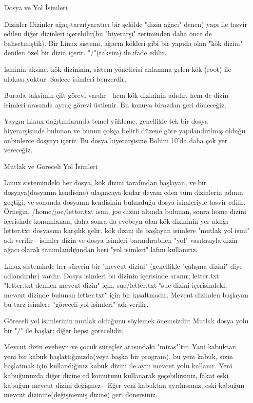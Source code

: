 \begin{section}{Dosya ve Yol İsimleri}
\begin{subsection}{Dizinler}
	Dizinler ağaç-tarzı(yaratıcı bir şekilde "dizin ağacı"  denen) yapı ile tasvir edilen diğer dizinleri içerebilir(bu "hiyerarşi" teriminden daha önce de bahsetmiştik). Bir Linux sistemi, ağacın kökleri gibi bir yapıda olan "kök dizini" denilen özel bir dizin içerir.  "/"(taksim) ile ifade edilir.
	
	İsminin aksine, kök dizininin, sistem yöneticisi anlamına gelen kök (root) ile alakası yoktur. Sadece isimleri benzerdir.
	
	Burada taksimin çift görevi vardır—hem kök dizininin adıdır, hem de dizin isimleri arasında ayraç görevi üstlenir. Bu konuya birazdan geri döneceğiz.
	
	Yaygın Linux dağıtımlarında temel yükleme, genellikle tek bir dosya hiyerarşisinde bulunan ve bunun çokça belirli düzene göre yapılandırılmış olduğu onbinlerce dosyayı içerir. Bu dosya hiyerarşisine Bölüm 10'da daha çok yer vereceğiz.
\end{subsection}
\begin{subsection}{Mutlak ve Göreceli Yol İsimleri}

Linux sistemindeki her dosya, kök dizini tarafından başlayan, ve bir dosyaya(dosyanın kendisine) ulaşıncaya kadar devam eden tüm dizinlerin adının geçtiği, ve sonunda dosyanın kendisinin bulunduğu dosya isimleriyle tasvir edilir. Örneğin, /home/joe/letter.txt ismi, joe dizini altında bulunan, sonra home dizini içerisinde konumlanan, daha sonra da evebeyn olan kök dizininin yer aldığı letter.txt dosyasına karşılık gelir. kök dizini ile başlayan isimlere "mutlak yol ismi" adı verilir—isimler dizin ve dosya isimleri barındırabilen "yol" vasıtasıyla dizin ağacı olarak tanımlandığından beri "yol isimleri" lafını kullanırız.

	Linux sisteminde her sürecin bir "mevcut dizini" (genellikle "çalışma dizini" diye adlandırılır) vardır. Dosya isimleri bu dizinin içerisinde aranır; letter.txt "letter.txt denilen mevcut dizin" için, sue/letter.txt "sue dizini içerisindeki, mevcut dizinde bulunan letter.txt" için bir kısaltmadır. Mevcut dizinden başlayan bu tarz isimlere "göreceli yol isimleri" adı verilir.
	
	Göreceli yol isimlerinin mutlak olduğunu söylemek önemsizdir: Mutlak dosya yolu bir "/" ile başlar; diğer hepsi görecelidir.
	
	Mevcut dizin evebeyn ve çocuk süreçler arasındaki "miras"'tır. Yani kabuktan yeni bir kabuk başlattığınızda(veya başka bir program), bu yeni kabuk, sizin başlatmak için kullandığınız kabuk dizini ile aynı mevcut yolu kullanır. Yeni kabuğunuzda diğer dizine cd komutunu kullanarak geçebilirsiniz, fakat eski kabuğun mevcut dizini değişmez—Eğer yeni kabuktan ayrılırsanız, eski kabuğun mevcut dizinine(değişmemiş dizine) geri dönersiniz. 
	

\end{subsection}
\end{section}
